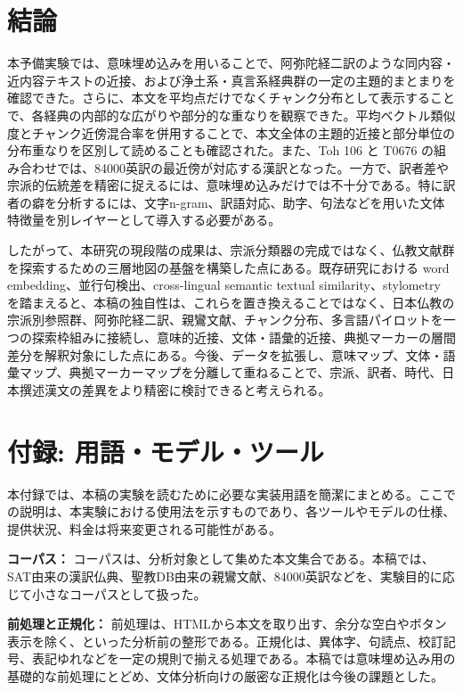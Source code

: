 \documentclass[uplatex,dvipdfmx,11pt,a4paper]{jsarticle}
\begin{document}
\section{結論}

本予備実験では、意味埋め込みを用いることで、阿弥陀経二訳のような同内容・近内容テキストの近接、および浄土系・真言系経典群の一定の主題的まとまりを確認できた。さらに、本文を平均点だけでなくチャンク分布として表示することで、各経典の内部的な広がりや部分的な重なりを観察できた。平均ベクトル類似度とチャンク近傍混合率を併用することで、本文全体の主題的近接と部分単位の分布重なりを区別して読めることも確認された。また、Toh 106 と T0676 の組み合わせでは、84000英訳の最近傍が対応する漢訳となった。一方で、訳者差や宗派的伝統差を精密に捉えるには、意味埋め込みだけでは不十分である。特に訳者の癖を分析するには、文字n-gram、訳語対応、助字、句法などを用いた文体特徴量を別レイヤーとして導入する必要がある。

したがって、本研究の現段階の成果は、宗派分類器の完成ではなく、仏教文献群を探索するための三層地図の基盤を構築した点にある。既存研究における word embedding、並行句検出、cross-lingual semantic textual similarity、stylometry を踏まえると、本稿の独自性は、これらを置き換えることではなく、日本仏教の宗派別参照群、阿弥陀経二訳、親鸞文献、チャンク分布、多言語パイロットを一つの探索枠組みに接続し、意味的近接、文体・語彙的近接、典拠マーカーの層間差分を解釈対象にした点にある。今後、データを拡張し、意味マップ、文体・語彙マップ、典拠マーカーマップを分離して重ねることで、宗派、訳者、時代、日本撰述漢文の差異をより精密に検討できると考えられる。

\section*{付録: 用語・モデル・ツール}

本付録では、本稿の実験を読むために必要な実装用語を簡潔にまとめる。ここでの説明は、本実験における使用法を示すものであり、各ツールやモデルの仕様、提供状況、料金は将来変更される可能性がある。

\noindent\textbf{コーパス：} コーパスは、分析対象として集めた本文集合である。本稿では、SAT由来の漢訳仏典、聖教DB由来の親鸞文献、84000英訳などを、実験目的に応じて小さなコーパスとして扱った。

\noindent\textbf{前処理と正規化：} 前処理は、HTMLから本文を取り出す、余分な空白やボタン表示を除く、といった分析前の整形である。正規化は、異体字、句読点、校訂記号、表記ゆれなどを一定の規則で揃える処理である。本稿では意味埋め込み用の基礎的な前処理にとどめ、文体分析向けの厳密な正規化は今後の課題とした。
\end{document}
